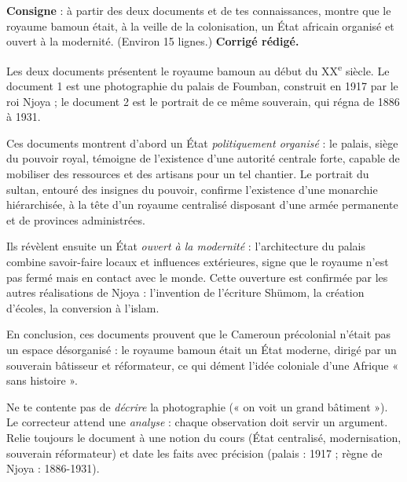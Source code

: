 \documentclass[11pt]{article}
\begin{document}
\begin{exoresolu}
\textbf{Consigne} : à partir des deux documents et de tes connaissances, montre que le royaume bamoun était, à la veille de la colonisation, un État africain organisé et ouvert à la modernité. (Environ 15 lignes.)
\tcblower
\textbf{Corrigé rédigé.}\par
Les deux documents présentent le royaume bamoun au début du XX\textsuperscript{e} siècle. Le document 1 est une photographie du palais de Foumban, construit en 1917 par le roi Njoya ; le document 2 est le portrait de ce même souverain, qui régna de 1886 à 1931.\par
Ces documents montrent d'abord un État \emph{politiquement organisé} : le palais, siège du pouvoir royal, témoigne de l'existence d'une autorité centrale forte, capable de mobiliser des ressources et des artisans pour un tel chantier. Le portrait du sultan, entouré des insignes du pouvoir, confirme l'existence d'une monarchie hiérarchisée, à la tête d'un royaume centralisé disposant d'une armée permanente et de provinces administrées.\par
Ils révèlent ensuite un État \emph{ouvert à la modernité} : l'architecture du palais combine savoir-faire locaux et influences extérieures, signe que le royaume n'est pas fermé mais en contact avec le monde. Cette ouverture est confirmée par les autres réalisations de Njoya : l'invention de l'écriture Shümom, la création d'écoles, la conversion à l'islam.\par
En conclusion, ces documents prouvent que le Cameroun précolonial n'était pas un espace désorganisé : le royaume bamoun était un État moderne, dirigé par un souverain bâtisseur et réformateur, ce qui dément l'idée coloniale d'une Afrique « sans histoire ».
\end{exoresolu}

\begin{attention}
Ne te contente pas de \emph{décrire} la photographie (« on voit un grand bâtiment »). Le correcteur attend une \emph{analyse} : chaque observation doit servir un argument. Relie toujours le document à une notion du cours (État centralisé, modernisation, souverain réformateur) et date les faits avec précision (palais : 1917 ; règne de Njoya : 1886-1931).
\end{attention}
\end{document}
